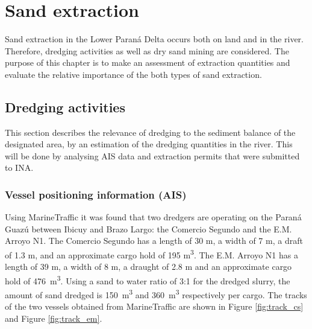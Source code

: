 \chapter{Sand extraction}
Sand extraction in the Lower Paraná Delta occurs both on land and in the river. Therefore, dredging activities as well as dry sand mining are considered. The purpose of this chapter is to make an assessment of extraction quantities and evaluate the relative importance of the both types of sand extraction. 

\section{Dredging activities}
This section describes the relevance of dredging to the sediment balance of the designated area, by an estimation of the dredging quantities in the river. This will be done by analysing AIS data and extraction permits that were submitted to INA.

\subsection{Vessel positioning information (AIS)}
Using MarineTraffic it was found that two dredgers are operating on the Paraná Guazú between Ibicuy and Brazo Largo: the Comercio Segundo and the E.M. Arroyo N1. The Comercio Segundo has a length of 30 m, a width of 7 m, a draft of 1.3 m, and an approximate cargo hold of 195 m\textsuperscript{3}. The E.M. Arroyo N1 has a length of 39 m, a width of 8 m, a draught of 2.8 m and an approximate cargo hold of 476 \,m\textsuperscript{3}. Using a sand to water ratio of 3:1 for the dredged slurry, the amount of sand dredged is 150 \,m\textsuperscript{3} and 360 \,m\textsuperscript{3} respectively per cargo. The tracks of the two vessels obtained from MarineTraffic are shown in Figure \ref{fig:track_cs} and Figure \ref{fig:track_em}.

